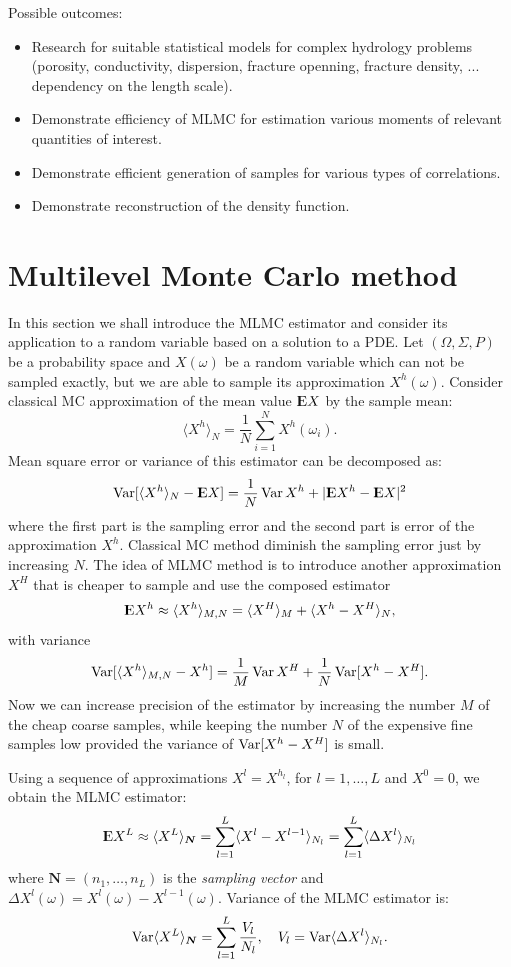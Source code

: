 \documentclass{article}
\def\vc#1{\mathbf{\boldsymbol{#1}}}     %
\def \E{{{\rm I\kern-.3em E}}}
\def\avg#1{\langle#1\rangle}
\def\Var{\mathop{\rm Var}}
\def\abs#1{|#1|}
\begin{document}
Possible outcomes:
\begin{itemize}
    \item Research for suitable statistical models for complex hydrology problems (porosity, conductivity, dispersion, fracture openning, fracture density, ... dependency on the length scale).
    \item Demonstrate efficiency of MLMC for estimation various moments of relevant quantities of interest.
    \item Demonstrate efficient generation of samples for various types of correlations.
    \item Demonstrate reconstruction of the density function.
\end{itemize}

\section{Multilevel Monte Carlo method}
In this section we shall introduce the MLMC estimator and consider its application to a random variable based on a solution to a PDE.
Let $(\Omega, \Sigma, P)$ be a probability space and $X(\omega)$ be a random variable
which can not be sampled exactly, but we are able to sample its approximation $X^h(\omega)$. 
Consider classical MC approximation of the mean value $\E X$ by the sample mean:
\[
	\avg{X^h}_N = \frac{1}{N}\sum_{i=1}^{N} X^h(\omega_i).
\]
Mean square error or variance of this estimator can be decomposed as:
\[
	\Var[ \avg{X^h}_N - \E X ] = \frac{1}{N} \Var X^h + \abs{\E X^h - \E X}^2
\]
where the first part is the sampling error and the second part is error of the approximation $X^h$. Classical MC method diminish the sampling error just by increasing $N$. The idea of MLMC method is to introduce another approximation $X^H$ that is cheaper to sample and use the composed estimator
\[
	\E X^h \approx \avg{X^h}_{M,N} = \avg{X^H}_M	 + \avg{X^h - X^H}_N, 
\]
with variance
\[
	\Var[\avg{X^h}_{M,N} - X^h] =  \frac{1}{M}\Var{X^H} + \frac{1}{N}\Var[X^h-X^H]. 
\]
Now we can increase precision of the estimator by increasing the number $M$ of the cheap coarse samples, while keeping the number $N$ of the expensive fine samples low provided the variance of
$\Var[X^h-X^H]$ is small.

Using a sequence of approximations $X^l = X^{h_l}$, for $l=1,\dots, L$ and $X^0 = 0$, we obtain the MLMC estimator:
\begin{equation}
    \label{eq:mlmc_est}
	\E X^L \approx \avg{X^L}_{\vc N} = \sum_{l=1}^L \avg{X^l - X^{l-1}}_{N_l} 	= \sum_{l=1}^L \avg{\Delta X^l}_{N_l}
\end{equation}
where $\vc N=(n_1,\dots, n_L)$ is the \emph{sampling vector} and $\Delta X^l(\omega) =X^l(\omega) - X^{l-1}(\omega)$. Variance of the MLMC estimator is:
\begin{equation}
    \label{eq:var_mlmc}
	\Var \avg{X^L}_{\vc N} = \sum_{l=1}^L \frac{V_l}{N_l},\quad V_l = \Var \avg{\Delta X^l}_{N_l}.
\end{equation}
\end{document}
